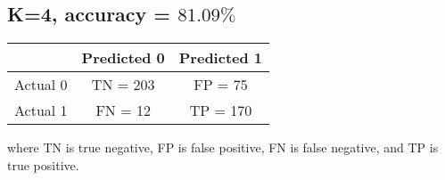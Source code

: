 \documentclass[11pt]{report}
\begin{document}
\subsection * {K=4, accuracy = \textbf{$81.09\%$}}
\begin{center}
\begin{tabular}{ |c|c|c| } 
 \hline
  & Predicted 0  & Predicted 1 \\ 
 \hline
 Actual 0 & TN = 203 & FP = 75 \\ 
  \hline
Actual 1  & FN = 12 &  TP = 170 \\ 
 \hline
\end{tabular}
\end{center}

\justify where TN is true negative, FP is false positive, FN is false negative, and TP is true positive. 
\end{document}

